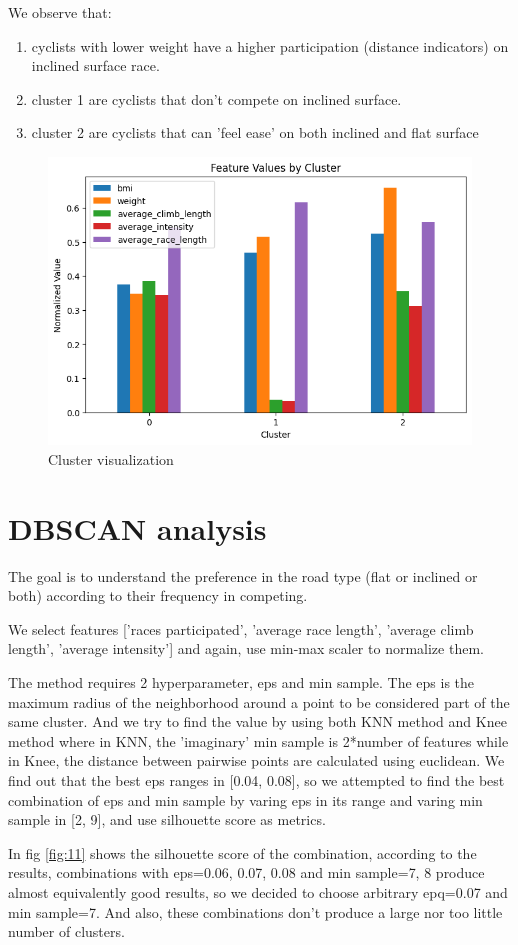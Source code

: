 \documentclass{article}
\begin{document}
We observe that: 
\begin{enumerate}
    \item cyclists with lower weight have a higher participation (distance indicators) on inclined surface race. 
    \item cluster 1 are cyclists that don't compete on inclined surface.
    \item cluster 2 are cyclists that can 'feel ease' on both inclined and flat surface
\end{enumerate}

\begin{figure}
\centering
\includegraphics[width=0.55\linewidth]{10.png}
\caption{\label{fig:10}Cluster visualization}
\end{figure}




\section{DBSCAN analysis}
The goal is to understand the preference in the road type (flat or inclined or both) according to their frequency in competing. 

We select features ['races participated', 'average race length', 'average climb length', 'average intensity'] and again, use min-max scaler to normalize them. 

The method requires 2 hyperparameter, eps and min sample. The eps is the maximum radius of the neighborhood around a point to be considered part of the same cluster. And we try to find the value by using both KNN method and Knee method where in KNN, the 'imaginary' min sample is 2*number of features while in Knee, the distance between pairwise points are calculated using euclidean. We find out that the best eps ranges in [0.04, 0.08], so we attempted to find the best combination of eps and min sample by varing eps in its range and varing min sample in [2, 9], and use silhouette score as metrics. 

In fig \ref{fig:11} shows the silhouette score of the combination, according to the results, combinations with eps={0.06, 0.07, 0.08} and min sample={7, 8} produce almost equivalently good results, so we decided to choose arbitrary epq=0.07 and min sample=7. And also, these combinations don't produce a large nor too little number of clusters.
\end{document}
